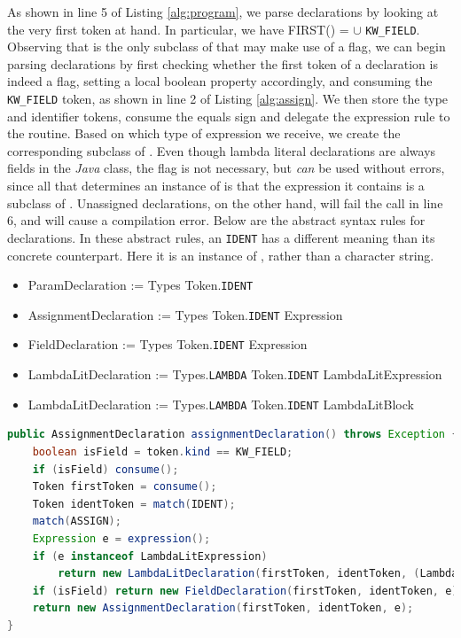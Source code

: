 As shown in line 5 of Listing \ref{alg:program}, we parse declarations by looking at the very first token at hand. In particular, we have FIRST() =  $\cup$ \texttt{KW\_FIELD}. Observing that  is the only subclass of  that may make use of a  flag, we can begin parsing declarations by first checking whether the first token of a declaration is indeed a  flag, setting a local boolean property accordingly, and consuming the \texttt{KW\_FIELD} token, as shown in line 2 of Listing \ref{alg:assign}. We then store the type and identifier tokens, consume the equals sign and delegate the expression rule to the  routine. Based on which type of expression we receive, we create the corresponding subclass of . Even though lambda literal declarations are always fields in the \emph{Java} class, the  flag is not necessary, but \emph{can} be used without errors, since all that determines an instance of  is that the expression it contains is a subclass of . Unassigned declarations, on the other hand, will fail the  call in line 6, and will cause a compilation error. Below are the abstract syntax rules for declarations. In these abstract rules, an \texttt{IDENT} has a different meaning than its concrete counterpart. Here it is an instance of , rather than a character string.

\begin{itemize}
	\item ParamDeclaration := Types Token.\texttt{IDENT}
	\item AssignmentDeclaration := Types Token.\texttt{IDENT} Expression
	\item FieldDeclaration := Types Token.\texttt{IDENT} Expression
	\item LambdaLitDeclaration := Types.\texttt{LAMBDA} Token.\texttt{IDENT} LambdaLitExpression
	\item LambdaLitDeclaration := Types.\texttt{LAMBDA} Token.\texttt{IDENT} LambdaLitBlock
\end{itemize}

\begin{lstlisting}[basicstyle=\scriptsize,language=Java,caption={Parsing Top-Level Declarations.},label={alg:assign}]
public AssignmentDeclaration assignmentDeclaration() throws Exception {
	boolean isField = token.kind == KW_FIELD;
	if (isField) consume();
	Token firstToken = consume();
	Token identToken = match(IDENT);
	match(ASSIGN);
	Expression e = expression();
	if (e instanceof LambdaLitExpression)
		return new LambdaLitDeclaration(firstToken, identToken, (LambdaLitExpression) e);
	if (isField) return new FieldDeclaration(firstToken, identToken, e);
	return new AssignmentDeclaration(firstToken, identToken, e);
}
\end{lstlisting}

